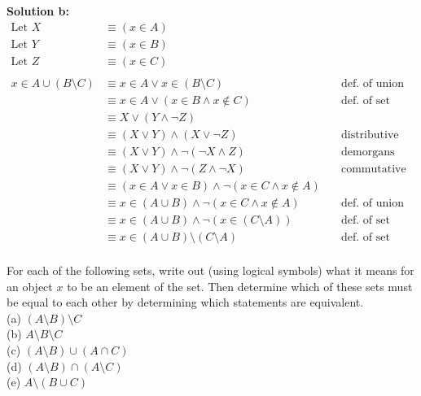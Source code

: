 \textbf{Solution b:}
\begin{align*}
\text{Let } X &\equiv (x \in A) & \\
\text{Let } Y &\equiv (x \in B) & \\
\text{Let } Z &\equiv (x \in C) & \\ & \\
x \in A \cup (B \setminus C) &\equiv x \in A \vee x \in (B \setminus C) &\quad \text{def. of union} & \\
&\equiv x \in A \vee (x \in B \wedge x \not \in C) & \quad \text {def. of set difference} & \\
&\equiv X \vee (Y \wedge \neg Z) & & \\
&\equiv (X \vee Y) \wedge (X \vee \neg Z) & \quad \text{distributive} & \\
&\equiv (X \vee Y) \wedge \neg (\neg X \wedge Z)  & \quad \text{demorgans} & \\
&\equiv (X \vee Y) \wedge \neg (Z \wedge \neg X) & \quad \text{commutative} & \\
&\equiv (x \in A \vee x \in B) \wedge \neg (x \in C \wedge x \not \in A) & \quad \text{} & \\
&\equiv x \in (A \cup B) \wedge \neg (x \in C \wedge x \not \in A) & \quad \text{def. of union} & \\
&\equiv x \in (A \cup B) \wedge \neg ( x \in (C \setminus A)) & \quad \text{def. of set difference} & \\
&\equiv x \in (A \cup B) \setminus (C \setminus A) & \quad \text{def. of set difference} & \\
\end{align*}

\begin{tcolorbox}[title=Problem 9, breakable]
For each of the following sets, write out (using logical symbols) what it means
for an object $x$ to be an element of the set. Then determine which of these sets
must be equal to each other by determining which statements are equivalent. \\
(a) $(A \setminus B) \setminus C$ \\
(b) $A \setminus B \setminus C$ \\
(c) $(A \setminus B) \cup (A \cap C)$ \\
(d) $(A \setminus B) \cap (A \setminus C)$ \\
(e) $A \setminus (B \cup C)$ \\
\end{tcolorbox}


